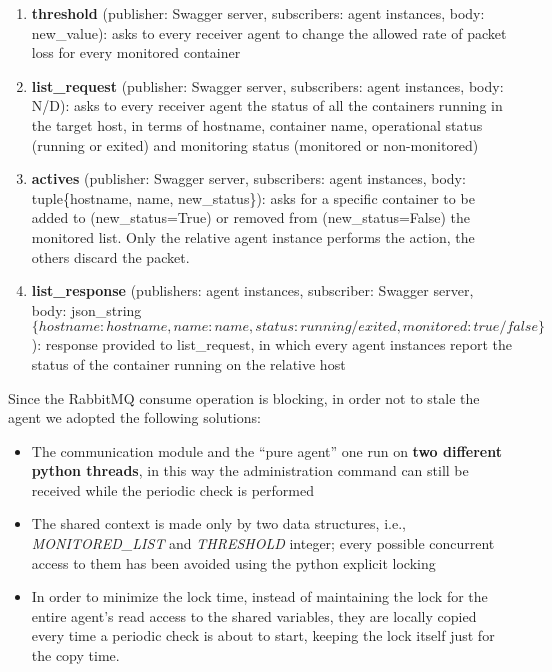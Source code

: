 \begin{enumerate}
	\item \textbf{threshold} (publisher: Swagger server, subscribers: agent instances, body: new\_value): asks to every receiver agent to change the allowed rate of packet loss for every monitored container
	\item \textbf{list\_request} (publisher: Swagger server, subscribers: agent instances, body: N/D): asks to every receiver agent the status of all the containers running in the target host, in terms of hostname, container name, operational status (running or exited) and monitoring status (monitored or non-monitored)
	\item \textbf{actives} (publisher: Swagger server, subscribers: agent instances, body: tuple\{hostname, name, new\_status\}): asks for a specific container to be added to (new\_status=True) or removed from (new\_status=False) the monitored list. Only the relative agent instance performs the action, the others discard the packet.
	\item \textbf{list\_response} (publishers: agent instances, subscriber: Swagger server, body: json\_string \[\{hostname: hostname, name: name, status: running/exited, monitored: true/false\}\]): response provided to list\_request, in which every agent instances report the status of the container running on the relative host
\end{enumerate}

\noindent Since the RabbitMQ consume operation is blocking, in order not to stale the agent we adopted the following solutions:
\begin{itemize}
	\item The communication module and the “pure agent” one run on \textbf{two different python threads}, in this way the administration command can still be received while the periodic check is performed
	\item The shared context is made only by two data structures, i.e.,  \textit{MONITORED\_LIST} and \textit{THRESHOLD} integer; every possible concurrent access to them has been avoided using the python explicit locking
	\item In order to minimize the lock time, instead of maintaining the lock for the entire agent’s read access to the shared variables, they are locally copied every time a periodic check is about to start, keeping the lock itself just for the copy time.
\end{itemize}

